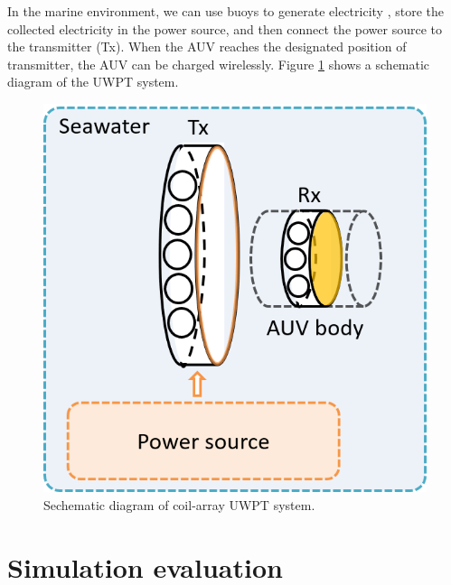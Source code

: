 In the marine environment, we can use buoys to generate electricity \cite{Orekan}, store the collected electricity in the power source, and then connect the power source to the transmitter (Tx). When the AUV reaches the designated position of transmitter, the AUV can be charged wirelessly.
Figure \ref{fig:3_coil_array_uwpt} shows a schematic diagram of the UWPT system.
\begin{figure}[htbp]
    \centering
    \includegraphics[width=0.5\linewidth]{images/3_coil_array_uwpt.png}
    \caption{Sechematic diagram of coil-array UWPT system.}
    \label{fig:3_coil_array_uwpt}
\end{figure}


\section{Simulation evaluation}


